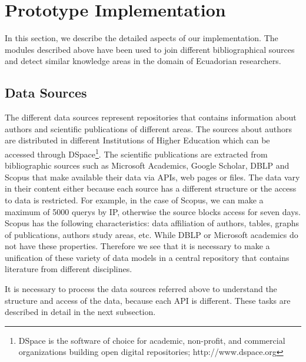 \documentclass[11pt]{article}
\begin{document}



\section{Prototype Implementation}
\label{label:usecase}

In this section, we describe the detailed aspects of our implementation. The modules described above have been used to join different bibliographical sources and detect similar knowledge areas in the domain of Ecuadorian researchers.

\subsection{Data Sources}
The different data sources represent repositories that contains information about authors and scientific publications of different areas. The sources about authors are distributed in different Institutions of Higher Education which can be accessed through DSpace\footnote{DSpace is the software of choice for academic, non-profit, and commercial organizations building open digital repositories; http://www.dspace.org}. The scientific publications  are extracted from bibliographic sources such as Microsoft Academics, Google Scholar, DBLP and Scopus that make available their data via APIs, web pages or files. The data vary in their content either because each source has a different structure or the access to data is restricted. For example, in the case of Scopus, we can make a maximum of 5000 querys  by IP, otherwise the source blocks access for seven days. Scopus has the following characteristics: data affiliation of authors, tables, graphs of publications, authors study areas, etc. While DBLP or Microsoft academics do not have these properties. Therefore we see  that it is necessary to make a unification of these variety of data models %
in a central repository that contains literature from different disciplines. 

It is necessary to process the data sources referred above to understand the structure and  access  of the data, because each API is different. These tasks are described in detail in the next subsection.
\end{document}
